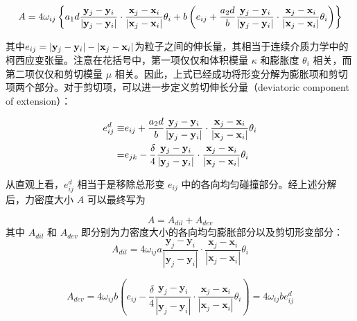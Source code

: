 \begin{equation}
\begin{aligned}
A =4\omega_{ij}\left\{a_1d\frac{\mathbf{y}_j-\mathbf{y}_i}{|\mathbf{y}_j-\mathbf{y}_i|}\cdot\frac{\mathbf{x}_j-\mathbf{x}_i}{|\mathbf{x}_j-\mathbf{x}_i|}\theta_i
   +b\left(e_{ij} + \frac{a_2d}{b}\frac{\mathbf{y}_j-\mathbf{y}_i}{|\mathbf{y}_j-\mathbf{y}_i|}\cdot\frac{\mathbf{x}_j-\mathbf{x}_i}{|\mathbf{x}_j-\mathbf{x}_i|}\theta_i\right) \right\}
\end{aligned}
\end{equation}

其中$e_{ij} = |\mathbf{y}_j - \mathbf{y}_i| - |\mathbf{x}_j - \mathbf{x}_i|$为粒子之间的伸长量，其相当于连续介质力学中的柯西应变张量。注意在花括号中，第一项仅仅和体积模量 $\kappa$ 和膨胀度 $\theta_i$ 相关，而第二项仅仅和剪切模量 $\mu$ 相关。因此，上式已经成功将形变分解为膨胀项和剪切项两个部分。对于剪切项，可以进一步定义剪切伸长分量（deviatoric component of extension）：

\begin{equation}
\begin{aligned}
e^d_{ij} \equiv& e_{ij} + \frac{a_2d}{b}\frac{\mathbf{y}_j-\mathbf{y}_i}{|\mathbf{y}_j-\mathbf{y}_i|}\cdot\frac{\mathbf{x}_j-\mathbf{x}_i}{|\mathbf{x}_j-\mathbf{x}_i|}\theta_i\\
                  =& e_{jk} - \frac{\delta}{4}\frac{\mathbf{y}_j-\mathbf{y}_i}{|\mathbf{y}_j-\mathbf{y}_i|}\cdot\frac{\mathbf{x}_j-\mathbf{x}_i}{|\mathbf{x}_j-\mathbf{x}_i|}\theta_i
\end{aligned}
\label{deviatoric_extension}
\end{equation}

从直观上看，$e^d_{ij}$ 相当于是移除总形变 $e_{ij}$ 中的各向均匀碰撞部分。经上述分解后，力密度大小 $A$ 可以最终写为

\begin{equation}
A = A_{dil} + A_{dev}
\end{equation}
其中 $A_{dil}$ 和 $A_{dev}$ 即分别为力密度大小的各向均匀膨胀部分以及剪切形变部分：
\begin{equation}
A_{dil}=4\omega_{ij}a\frac{\mathbf{y}_j-\mathbf{y}_i}{|\mathbf{y}_j-\mathbf{y}_i|}\cdot\frac{\mathbf{x}_j-\mathbf{x}_i}{|\mathbf{x}_j-\mathbf{x}_i|}\theta_i
\end{equation}

\begin{equation}
A_{dev}=4\omega_{ij}b(e_{ij}-\frac{\delta}{4}\frac{\mathbf{y}_j-\mathbf{y}_i}{|\mathbf{y}_j-\mathbf{y}_i|}\cdot\frac{\mathbf{x}_j-\mathbf{x}_i}{|\mathbf{x}_j-\mathbf{x}_i|}\theta_i)
       =4\omega_{ij}be^d_{ij}
\label{Adev}
\end{equation}


